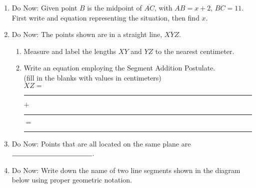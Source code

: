 \documentclass[12pt, twoside]{article}
\begin{document}
\begin{enumerate}
\newpage
\item Do Now: Given point $B$ is the midpoint of $\overline{AC}$, with $AB=x+2$, $BC=11$. \\[0.3cm]
    First write and equation representing the situation, then find $x$.\\[0.3cm]
      \vspace{1cm}

\item Do Now: The points shown are in a straight line, $\overline{XYZ}$. 
\begin{enumerate}
  \item Measure and label the lengths $XY$ and $YZ$ to the nearest centimeter.\\[1.5cm]
     \vspace{0.5cm}
  \item Write an equation employing the Segment Addition Postulate.\\ (fill in the blanks with values in centimeters)\\[1cm]
  $XZ=$ \rule{2cm}{0.15mm} $+$ \rule{2cm}{0.15mm} $=$ \rule{2cm}{0.15mm}
\end{enumerate} \vspace{0.5cm}

\item Do Now: Points that are all located on the same plane are $\rule{4cm}{0.15mm}$.

\item Do Now: Write down the name of two line segments shown in the diagram below using proper geometric notation.
  \begin{center}
  \end{center}


\end{enumerate}
\end{document}
